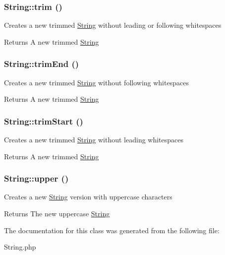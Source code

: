 \hypertarget{classString_ac3a075e35b0f39698230957bc7d0172d}{
\subsubsection[{trim}]{\setlength{\rightskip}{0pt plus 5cm}String::trim ()}}
\label{classString_ac3a075e35b0f39698230957bc7d0172d}
Creates a new trimmed \hyperlink{classString}{String} without leading or following whitespaces \begin{DoxyReturn}{Returns}
A new trimmed \hyperlink{classString}{String} 
\end{DoxyReturn}
\hypertarget{classString_a316e68c5acc7716e4aac01c78a1b5063}{
\subsubsection[{trimEnd}]{\setlength{\rightskip}{0pt plus 5cm}String::trimEnd ()}}
\label{classString_a316e68c5acc7716e4aac01c78a1b5063}
Creates a new trimmed \hyperlink{classString}{String} without following whitespaces \begin{DoxyReturn}{Returns}
A new trimmed \hyperlink{classString}{String} 
\end{DoxyReturn}
\hypertarget{classString_a34b1f94648606639f31a7596445ff52e}{
\subsubsection[{trimStart}]{\setlength{\rightskip}{0pt plus 5cm}String::trimStart ()}}
\label{classString_a34b1f94648606639f31a7596445ff52e}
Creates a new trimmed \hyperlink{classString}{String} without leading whitespaces \begin{DoxyReturn}{Returns}
A new trimmed \hyperlink{classString}{String} 
\end{DoxyReturn}
\hypertarget{classString_a07d720a3ea80bbc85f7424d2d7c27701}{
\subsubsection[{upper}]{\setlength{\rightskip}{0pt plus 5cm}String::upper ()}}
\label{classString_a07d720a3ea80bbc85f7424d2d7c27701}
Creates a new \hyperlink{classString}{String} version with uppercase characters \begin{DoxyReturn}{Returns}
The new uppercase \hyperlink{classString}{String} 
\end{DoxyReturn}


The documentation for this class was generated from the following file:\begin{DoxyCompactItemize}
\item 
String.php\end{DoxyCompactItemize}
